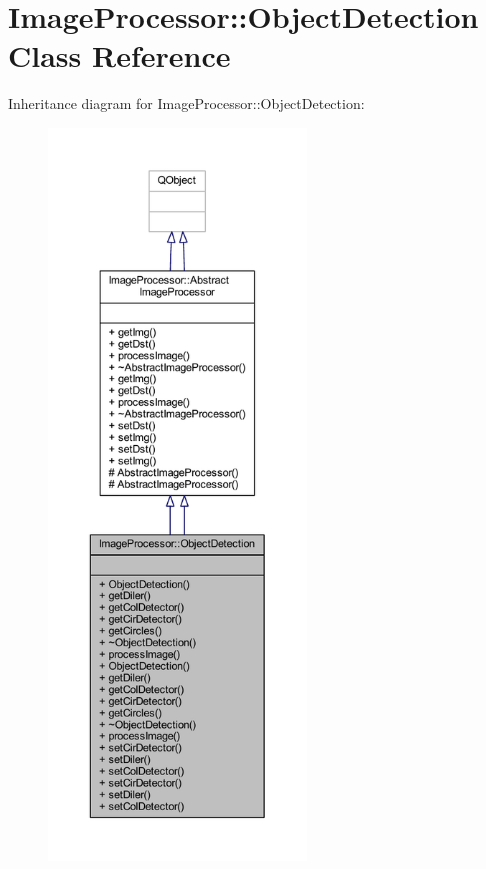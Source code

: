 \hypertarget{class_image_processor_1_1_object_detection}{}\section{Image\+Processor\+:\+:Object\+Detection Class Reference}
\label{class_image_processor_1_1_object_detection}


Inheritance diagram for Image\+Processor\+:\+:Object\+Detection\+:\nopagebreak
\begin{figure}[H]
\begin{center}
\leavevmode
\includegraphics[height=550pt]{da/d04/class_image_processor_1_1_object_detection__inherit__graph}
\end{center}
\end{figure}


